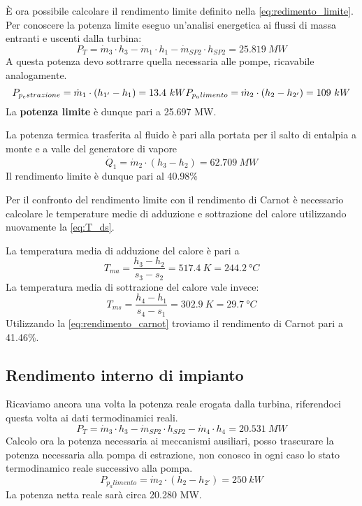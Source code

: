 È ora possibile calcolare il rendimento limite definito nella \eqref{eq:redimento_limite}. Per conoscere la potenza limite eseguo un'analisi energetica
ai flussi di massa entranti e uscenti dalla turbina:
\begin{equation*}
    P_T = \dot m_3 \cdot h_3 - \dot m_1 \cdot h_1 - \dot m_{SP2} \cdot h_{SP2} = 25.819\ MW
\end{equation*}
A questa potenza devo sottrarre quella necessaria alle pompe, ricavabile analogamente.
\begin{equation*}
    P_{p_estrazione} = \dot m_1 \cdot \left( h_{1'} - h_1 \right) = 13.4\ kW \\
    P_{p_alimento} = \dot m_2 \cdot \left( h_2 - h_{2'} \right) = 109\ kW 
\end{equation*}
La \textbf{potenza limite} è dunque pari a 25.697 MW.

La potenza termica trasferita al fluido è pari alla portata per il salto di entalpia a monte e a valle del generatore di vapore
\begin{equation*}
    \dot Q_1 = \dot m_2 \cdot (h_3-h_2) = 62.709\ MW
\end{equation*}
Il rendimento limite è dunque pari al 40.98\%

Per il confronto del rendimento limite con il rendimento di Carnot è necessario calcolare le temperature medie di adduzione e sottrazione del calore
utilizzando nuovamente la \eqref{eq:T_ds}.

La temperatura media di adduzione del calore è pari a
\begin{equation*}
    T_{ma} = \frac{h_3 - h_2}{s_3 - s_2} = 517.4\ K = 244.2\ \text{°}C
\end{equation*}
La temperatura media di sottrazione del calore vale invece:
\begin{equation*}
    T_{ms} = \frac{h_4-h_1}{s_4 - s_1} = 302.9\ K = 29.7\ \text{°}C
\end{equation*}
Utilizzando la \eqref{eq:rendimento_carnot} troviamo il rendimento di Carnot pari a 41.46\%.

\subsection{Rendimento interno di impianto}
Ricaviamo ancora una volta la potenza reale erogata dalla turbina, riferendoci questa volta ai dati termodinamici reali.
\begin{equation*}
    P_T = \dot m_3 \cdot h_3 - \dot m_{SP2} \cdot h_{SP2} - \dot m_4 \cdot h_4 = 20.531\ MW
\end{equation*}
Calcolo ora la potenza necessaria ai meccanismi ausiliari, posso trascurare la potenza necessaria alla pompa di estrazione, non conosco in ogni caso lo stato termodinamico
reale successivo alla pompa.
\begin{equation*}
    P_{p_alimento} = \dot m_2 \cdot \left( h_2 - h_{2'} \right) = 250\ kW 
\end{equation*}
La potenza netta reale sarà circa 20.280 MW.

